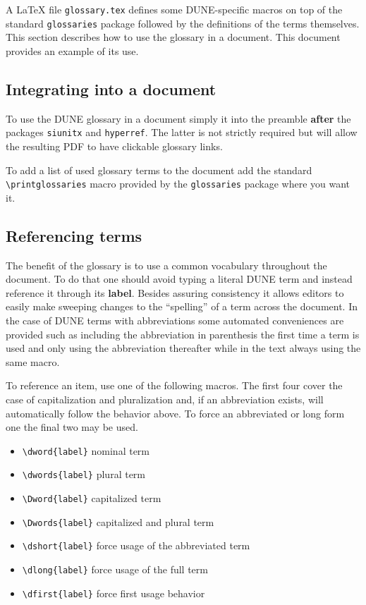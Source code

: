 \documentclass{article}
\begin{document}
A \LaTeX{} file \texttt{glossary.tex} defines some DUNE-specific
macros on top of the standard \texttt{glossaries} package followed by
the definitions of the terms themselves. 
This section describes how to use the glossary in a document. 
This document provides an example of its use.

\subsection{Integrating into a document}

To use the DUNE glossary in a document simply \verb|| it into
the preamble \textbf{after} the packages \texttt{siunitx} and
\texttt{hyperref}. 
The latter is not strictly required but will allow the resulting PDF
to have clickable glossary links. 

To add a list of used glossary terms to the document add the standard
\verb|\printglossaries| macro provided by the \texttt{glossaries}
package where you want it.

\subsection{Referencing terms}
\label{sec:referencing}

The benefit of the glossary is to use a common vocabulary throughout
the document. 
To do that one should avoid typing a literal DUNE term and instead
reference it through its \textbf{label}. 
Besides assuring consistency it allows editors to easily make sweeping
changes to the ``spelling'' of a term across the document. 
In the case of DUNE terms with abbreviations some automated
conveniences are provided such as including the abbreviation in
parenthesis the first time a term is used and only using the
abbreviation thereafter while in the text always using the same macro.

To reference an item, use one of the following macros. 
The first four cover the case of capitalization and pluralization and,
if an abbreviation exists, will automatically follow the behavior
above. 
To force an abbreviated or long form one the final two may be used.

\begin{itemize}
\item \verb|\dword{label}| nominal term
\item \verb|\dwords{label}| plural term
\item \verb|\Dword{label}| capitalized term
\item \verb|\Dwords{label}| capitalized and plural term
\item \verb|\dshort{label}| force usage of the abbreviated term
\item \verb|\dlong{label}| force usage of the full term
\item \verb|\dfirst{label}| force first usage behavior
\end{itemize}
\end{document}
